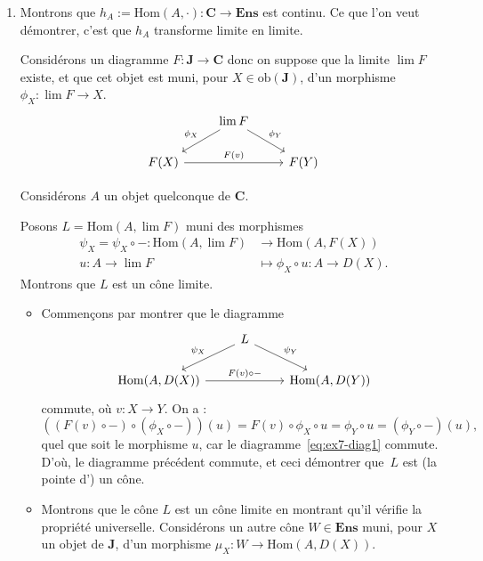 \documentclass{../../td}
\begin{document}
  \begin{enumerate}
    \item Montrons que $h_A := \mathrm{Hom}(A, \cdot): \mathbf{C} \to \mathbf{Ens}$ est continu.
      Ce que l'on veut démontrer, c'est que $h_A$ transforme limite en limite.

      Considérons un diagramme $F : \mathbf{J} \to \mathbf{C}$ donc on suppose que la limite $\lim F$ existe, et que cet objet est muni, pour $X \in \mathrm{ob}(\mathbf{J})$, d'un morphisme $\phi_X : \lim F \to X$.
      \begin{equation}
        \begin{tikzcd}
          & \lim F \arrow[swap]{dl}{\phi_X} \arrow{dr}{\phi_Y}\\
          F(X) \arrow{rr}{F(v)} && F(Y)
        \end{tikzcd}
        \label{eq:ex7-diag1}
      \end{equation}

      Considérons $A$ un objet quelconque de $\mathbf{C}$.

      Posons $L = \mathrm{Hom}(A, \lim F)$ muni des morphismes \begin{align*}
        \psi_X = \psi_X \circ -: \mathrm{Hom}(A, \lim F) &\longrightarrow \mathrm{Hom}(A, F(X)) \\
        u : A \to \lim F &\longmapsto \phi_X \circ u : A \to D(X)
      .\end{align*}
      Montrons que $L$ est un cône limite.
      \begin{itemize}
        \item Commençons par montrer que le diagramme \[
          \begin{tikzcd}
            & L \arrow[swap]{dl}{\psi_X} \arrow{dr}{\psi_Y}\\
            \mathrm{Hom}(A, D(X)) \arrow{rr}{F(v)\circ -} && \mathrm{Hom}(A, D(Y))
          \end{tikzcd}
          \] 
          commute, où $v : X \to Y$.
          On a :
          \[
            ((F(v)\circ -) \circ (\phi_X \circ -))(u) = 
            F(v)\circ \phi_X \circ u = \phi_Y \circ u = (\phi_Y \circ -)(u)
          ,\] quel que soit le morphisme $u$, car le diagramme~\ref{eq:ex7-diag1} commute.
          D'où, le diagramme précédent commute, et ceci démontrer que~$L$ est (la pointe d') un cône.
        \item Montrons que le cône $L$ est un cône limite en montrant qu'il vérifie la propriété universelle.
          Considérons un autre cône $W \in \mathbf{Ens}$ muni, pour $X$ un objet de $\mathbf{J}$, d'un morphisme $\mu_X : W \to \mathrm{Hom}(A, D(X))$.


\end{itemize}
\end{enumerate}
\end{document}
